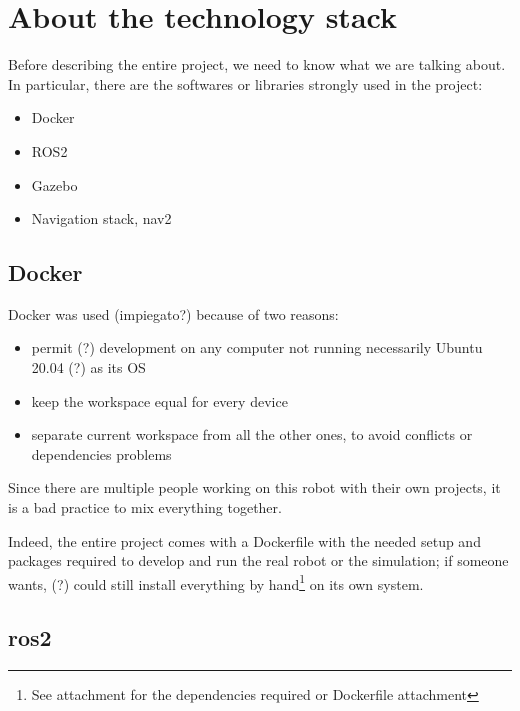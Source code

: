 \chapter{About the technology stack}
\label{cha:techstack}

Before describing the entire project, we need to know what we are talking about. In particular, there are the softwares or libraries strongly used in the project:  
\begin{itemize}
    \item Docker
    \item ROS2
    \item Gazebo
    \item Navigation stack, nav2
    \end{itemize}

\section{Docker}

Docker was used (impiegato?) because of two reasons:
\begin{itemize}
    \item permit (?) development on any computer not running necessarily Ubuntu 20.04 (?) as its OS
    \item keep the workspace equal for every device
    \item separate current workspace from all the other ones, to avoid conflicts or dependencies problems
\end{itemize}  

Since there are multiple people working on this robot with their own projects, it is a bad practice to mix everything together. %

Indeed, the entire project comes with a Dockerfile with the needed setup and packages required to develop and run the real robot or the simulation; if someone wants, (?) could still install everything by hand\footnote{See attachment for the dependencies required or Dockerfile attachment} on its own system.


\section{\Acrshort{ros}2}


